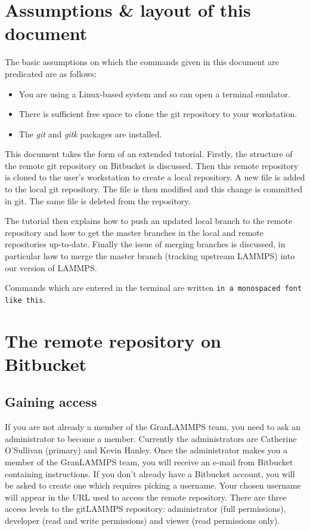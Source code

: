 \documentclass[a4paper,oneside,11pt]{article}
\begin{document}
\tableofcontents
\newpage

\section{Assumptions \& layout of this document}
The basic assumptions on which the commands given in this document are predicated are as follows:
\begin{itemize}
  \item You are using a Linux-based system and so can open a terminal emulator.
  \item There is sufficient free space to clone the git repository to your workstation.
  \item The \textit{git} and \textit{gitk} packages are installed.
\end{itemize}
This document takes the form of an extended tutorial. Firstly, the structure of the remote git repository on Bitbucket is discussed. Then this remote repository is cloned to the user's workstation to create a local repository. A new file is added to the local git repository. The file is then modified and this change is committed in git. The same file is deleted from the repository. 

The tutorial then explains how to push an updated local branch to the remote repository and how to get the master branches in the local and remote repositories up-to-date. Finally the issue of merging branches is discussed, in particular how to merge the master branch (tracking upstream LAMMPS) into our version of LAMMPS.

Commands which are entered in the terminal are written \texttt{in a monospaced font like this}.

\section{The remote repository on Bitbucket}

\subsection{Gaining access}\label{ssec:rrga}
If you are not already a member of the GranLAMMPS team, you need to ask an administrator to become a member. Currently the administrators are Catherine O'Sullivan (primary) and Kevin Hanley. Once the administrator makes you a member of the GranLAMMPS team, you will receive an e-mail from Bitbucket containing instructions. If you don't already have a Bitbucket account, you will be asked to create one which requires picking a username. Your chosen username will appear in the URL used to access the remote repository. There are three access levels to the gitLAMMPS repository: administrator (full permissions), developer (read and write permissions) and viewer (read permissions only).
\end{document}
